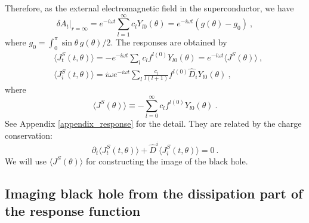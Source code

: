 \documentclass[a4paper,11pt]{article}
\begin{document}
    Therefore, as the external electromagnetic field in the superconductor, we have
    \begin{equation}
        \label{eq:scalar_mode_source}
        \delta A_t|_{r=\infty}
        =e^{-i \omega t}\sum_{l=1}^\infty c_l Y_{l0}(\theta)
        =e^{-i \omega t}(g(\theta)-g_0)\ ,
    \end{equation}
    where $g_0=\int_0^\pi \sin\theta \,g(\theta)/2$.
    The responses are obtained by
    \begin{align}
        &\langle J^S_t(t,\theta) \rangle  
        =- e^{-i \omega t} \sum_{l} c_{l} f^{l(0)} Y_{l0}(\theta)
        = e^{-i \omega t}  \langle J^S(\theta) \rangle\ ,\label{eq:scalar_mode_response_t} \\
        &\langle J^S_i(t,\theta) \rangle  
        =i\omega e^{-i \omega t} \sum_{l} \frac{c_l}{l(l+1)} f^{l(0)} \hat{D}_i Y_{l0}(\theta)\ ,\label{eq:scalar_mode_response_i}
    \end{align}
    where 
    \begin{equation}
        \langle J^S(\theta) \rangle  \equiv -\sum_{l=0}^\infty c_{l} f^{l(0)} Y_{l0}(\theta)\ .
    \end{equation}
    See Appendix \ref{appendix_response} for the detail.
    They are related by the charge conservation: 
    \begin{equation}
        \partial_t \langle J^S_t(t,\theta) \rangle + \hat{D}^i\langle J^S_i(t,\theta) \rangle = 0\ .
    \end{equation}
    We will use $\langle J^S(\theta) \rangle$ for constructing the image of the black hole.




\subsection{Imaging black hole from the dissipation part of the response function}
\end{document}
